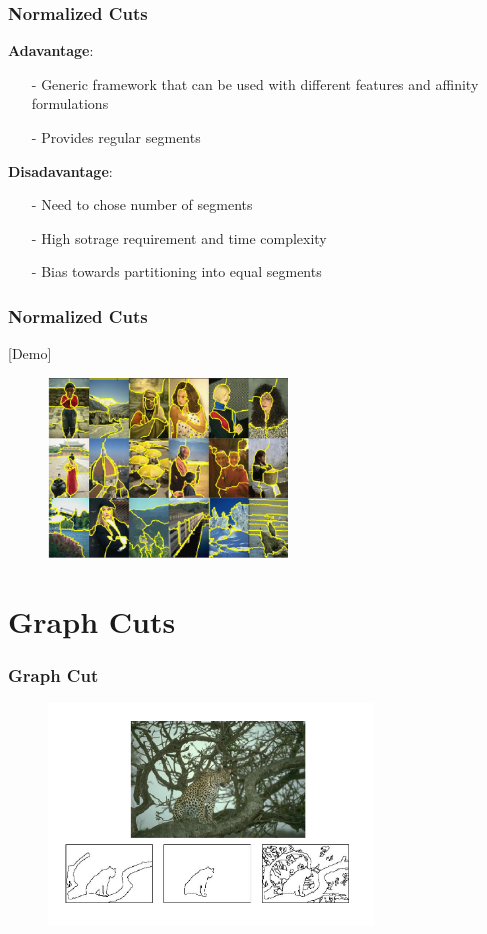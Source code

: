 \documentclass[notheorems,mathserif,table,compress]{beamer}  %
\begin{document}
\begin{frame}
\frametitle{Normalized Cuts}
\textbf{\Large Adavantage}:
\begin{itemize}
\item[-] Generic framework that can be used with different features and affinity formulations
\item[-] Provides regular segments \\
\end{itemize}
\textbf{\Large Disadavantage}:
\begin{itemize}
\item[-] Need to chose number of segments
\item[-] High sotrage requirement and time complexity
\item[-] Bias towards partitioning into equal segments
\end{itemize}
\end{frame}


\begin{frame}
\frametitle{Normalized Cuts}
    \hspace{0.5in} {\color{blue} [Demo]}
    \begin{figure}[!ht]
     \centering
     \includegraphics[width=2.5in]{NORMALE.png} 
     \end{figure}
\end{frame}

\section{Graph Cuts}
\begin{frame}
\frametitle{Graph Cut}
  \begin{figure}[!ht]
  \centering
   \includegraphics[width=3.4in]{pic.png}
   \end{figure}
\end{frame}
\end{document}
